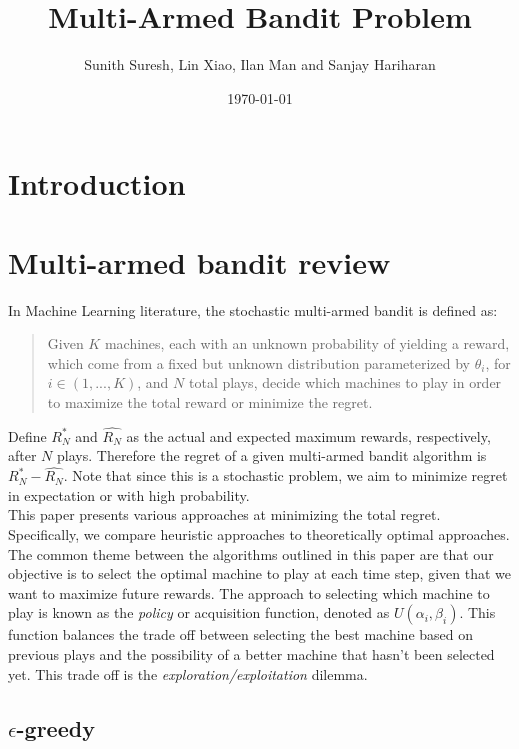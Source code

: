 \documentclass{article}
\title{Multi-Armed Bandit Problem}
\author{Sunith Suresh, Lin Xiao, Ilan Man and Sanjay Hariharan}
\date{\today}
\begin{document}
\maketitle

\section{Introduction}

\section{Multi-armed bandit review}

In Machine Learning literature, the stochastic multi-armed bandit is defined as: 

\begin{quote}
Given $K$ machines, each with an unknown probability of yielding a reward, which come from a fixed but unknown distribution parameterized by $\theta_i$, for $i \in (1, ..., K)$, and $N$ total plays, decide which machines to play in order to maximize the total reward or minimize the regret.
\end{quote}

Define $R_{N}^{*}$ and $\hat{R_{N}}$ as the actual and expected maximum rewards, respectively, after $N$ plays. Therefore the regret of a given multi-armed bandit algorithm is $R_{N}^{*} - \hat{R_{N}}$. Note that since this is a stochastic problem, we aim to minimize regret in expectation or with high probability.\\

This paper presents various approaches at minimizing the total regret. Specifically, we compare heuristic approaches to theoretically optimal approaches.\\

The common theme between the algorithms outlined in this paper are that our objective is to select the optimal machine to play at each time step, given that we want to maximize future rewards. The approach to selecting which machine to play is known as the \textit{policy} or acquisition function, denoted as $U(\alpha_i, \beta_i)$. This function balances the trade off between selecting the best machine based on previous plays and the possibility of a better machine that hasn't been selected yet. This trade off is the \textit{exploration/exploitation} dilemma.\\


\subsection{$\epsilon$-greedy}
\end{document}
